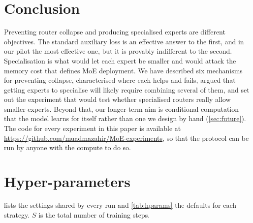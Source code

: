\documentclass[10pt]{article}
\theoremstyle{definition}
\theoremstyle{remark}
\begin{document}
\section{Conclusion}
Preventing router collapse and producing specialised experts are different objectives. The standard auxiliary loss is an effective answer to the first, and in our pilot the most effective one, but it is provably indifferent to the second. Specialisation is what would let each expert be smaller and would attack the memory cost that defines MoE deployment. We have described six mechanisms for preventing collapse, characterised where each helps and fails, argued that getting experts to specialise will likely require combining several of them, and set out the experiment that would test whether specialised routers really allow smaller experts. Beyond that, our longer-term aim is conditional computation that the model learns for itself rather than one we design by hand (\cref{sec:future}). The code for every experiment in this paper is available at \url{https://github.com/muadmazahir/MoE-experiments}, so that the protocol can be run by anyone with the compute to do so.




\clearpage
\appendix
\section{Hyper-parameters}
 lists the settings shared by every run and \cref{tab:hparams} the defaults for each strategy. $S$ is the total number of training steps.
\end{document}
